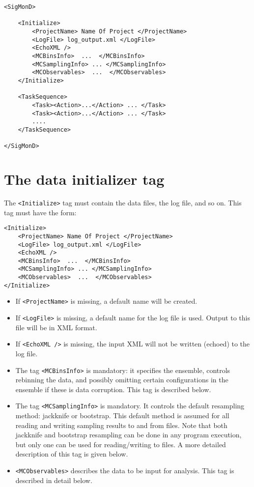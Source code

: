 \documentclass[12pt]{article}
\newcommand{\vb}{\texttt}
\begin{document}
\begin{verbatim}
<SigMonD>

    <Initialize>
        <ProjectName> Name Of Project </ProjectName>
        <LogFile> log_output.xml </LogFile>
        <EchoXML />
        <MCBinsInfo>  ...  </MCBinsInfo>
        <MCSamplingInfo> ... </MCSamplingInfo>
        <MCObservables>  ...  </MCObservables>
    </Initialize>

    <TaskSequence>
        <Task><Action>...</Action> ... </Task>
        <Task><Action>...</Action> ... </Task>
        ....
    </TaskSequence>

</SigMonD>
\end{verbatim}

\section{The data initializer tag}
The \vb{<Initialize>} tag must contain the data files, the log file, and so on.
This tag must have the form:
\begin{verbatim}
<Initialize>
    <ProjectName> Name Of Project </ProjectName>
    <LogFile> log_output.xml </LogFile>
    <EchoXML />
    <MCBinsInfo>  ...  </MCBinsInfo>
    <MCSamplingInfo> ... </MCSamplingInfo>
    <MCObservables>  ...  </MCObservables>
</Initialize>
\end{verbatim}
\begin{itemize}
\item
  If \vb{<ProjectName>} is missing, a default name will be created.
\item
  If \vb{<LogFile>} is missing, a default name for the log file is used.
  Output to this file will be in XML format.
\item
  If \vb{<EchoXML />} is missing, the input XML will not be written (echoed)
  to the log file.
\item
  The tag \vb{<MCBinsInfo>} is mandatory: it specifies the ensemble,
  controls rebinning the data, and possibly omitting certain configurations
  in the ensemble if these is data corruption.  This tag is described below.
\item
  The tag \vb{<MCSamplingInfo>} is mandatory.  It controls the default
  resampling method:  jackknife or bootstrap.  This default method
  is assumed for all reading and writing sampling results to and
  from files.  Note that both jackknife and bootstrap resampling
  can be done in any program execution, but only one can be used
  for reading/writing to files.  A more detailed
  description of this tag is given below.
\item
  \vb{<MCObservables>} describes the data to be input for analysis. This
  tag is described in detail below.
\end{itemize}
\end{document}
